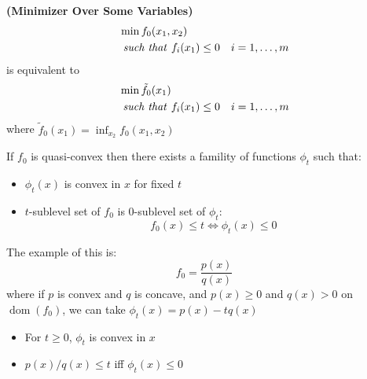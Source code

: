 \begin{proposition}{\textbf{(Minimizer Over Some Variables)}}
    \begin{equation*}
    \begin{aligned}
        &\min f_0(x_1, x_2) \\
        &\text{\emph{ such that }} \begin{aligned}[t]
            f_i(x_1)\le0\quad i=1,\dots,m 
        \end{aligned}
    \end{aligned}
    \end{equation*}
    is equivalent to 
    \begin{equation*}
    \begin{aligned}
        &\min \tilde{f}_0(x_1) \\
        &\text{\emph{ such that }} \begin{aligned}[t]
            f_i(x_1)\le0\quad i=1,\dots,m 
        \end{aligned}
    \end{aligned}
    \end{equation*}
    where $\tilde{f}_0(x_1) = \inf_{x_2}f_0(x_1,x_2)$
\end{proposition}

\begin{proposition}
    If $f_0$ is quasi-convex then there exists a famility of functions $\phi_t$ such that: 
    \begin{itemize}
        \item $\phi_t(x)$ is convex in $x$ for fixed $t$ 
        \item $t$-sublevel set of $f_0$ is $0$-sublevel set of $\phi_t$:
        \begin{equation*}
            f_0(x)\le t \iff \phi_t(x) \le 0
        \end{equation*}
    \end{itemize}
\end{proposition}

\begin{remark}
    The example of this is:
    \begin{equation*}
        f_0 = \frac{p(x)}{q(x)}
    \end{equation*}
    where if $p$ is convex and $q$ is concave, and $p(x)\ge0$ and $q(x)>0$ on $\operatorname{dom}(f_0)$, we can take $\phi_t(x) = p(x) - tq(x)$
    \begin{itemize}
        \item For $t\ge0$, $\phi_t$ is convex in $x$
        \item $p(x)/q(x)\le t$ iff $\phi_t(x)\le0$
    \end{itemize}
\end{remark}

